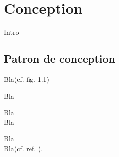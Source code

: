 \chapter{Conception}
\label{conception}
Intro\footnotemark\\

\section{Patron de conception}

Bla(cf. fig. 1.1)\\



{}

Bla

Bla\\

Bla




Bla\footnotemark\\

Bla(cf. ref. \cite{cite6}).

